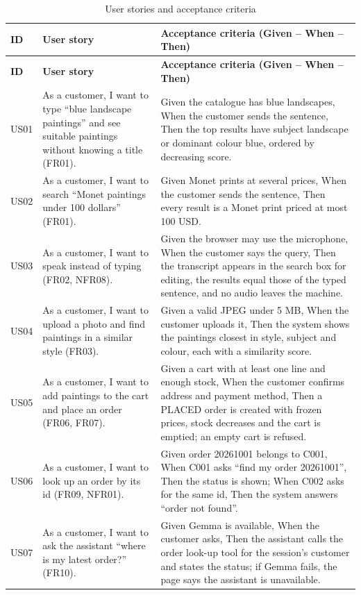 \begin{longtable}{@{}P{1.1cm}P{5.2cm}P{8.7cm}@{}}
\caption{User stories and acceptance criteria}\label{tab:stories}\\
\toprule
\textbf{ID} & \textbf{User story} & \textbf{Acceptance criteria (Given -- When -- Then)}\\
\midrule
\endfirsthead
\toprule
\textbf{ID} & \textbf{User story} & \textbf{Acceptance criteria (Given -- When -- Then)}\\
\midrule
\endhead
\small US01 & \small As a customer, I want to type ``blue landscape paintings'' and see suitable paintings without knowing a title (FR01). & \small Given the catalogue has blue landscapes, When the customer sends the sentence, Then the top results have subject landscape or dominant colour blue, ordered by decreasing score.\\
\small US02 & \small As a customer, I want to search ``Monet paintings under 100 dollars'' (FR01). & \small Given Monet prints at several prices, When the customer sends the sentence, Then every result is a Monet print priced at most 100 USD.\\
\small US03 & \small As a customer, I want to speak instead of typing (FR02, NFR08). & \small Given the browser may use the microphone, When the customer says the query, Then the transcript appears in the search box for editing, the results equal those of the typed sentence, and no audio leaves the machine.\\
\small US04 & \small As a customer, I want to upload a photo and find paintings in a similar style (FR03). & \small Given a valid JPEG under 5 MB, When the customer uploads it, Then the system shows the paintings closest in style, subject and colour, each with a similarity score.\\
\small US05 & \small As a customer, I want to add paintings to the cart and place an order (FR06, FR07). & \small Given a cart with at least one line and enough stock, When the customer confirms address and payment method, Then a PLACED order is created with frozen prices, stock decreases and the cart is emptied; an empty cart is refused.\\
\small US06 & \small As a customer, I want to look up an order by its id (FR09, NFR01). & \small Given order 20261001 belongs to C001, When C001 asks ``find my order 20261001'', Then the status is shown; When C002 asks for the same id, Then the system answers ``order not found''.\\
\small US07 & \small As a customer, I want to ask the assistant ``where is my latest order?'' (FR10). & \small Given Gemma is available, When the customer asks, Then the assistant calls the order look-up tool for the session's customer and states the status; if Gemma fails, the page says the assistant is unavailable.\\

\end{longtable}
